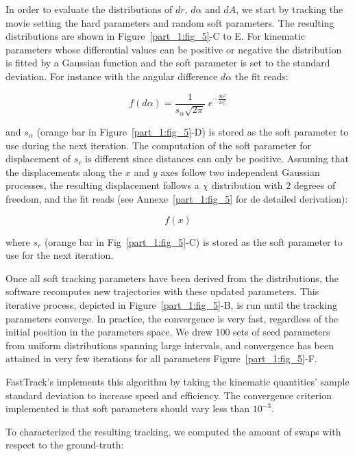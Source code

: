     In order to evaluate the distributions of $dr$, $d\alpha$ and $dA$, we start by tracking the movie setting the hard parameters and random soft parameters. The resulting distributions are shown in Figure~\ref{part_1:fig_5}-C to E. For kinematic parameters whose differential values can be positive or negative the distribution is fitted by a Gaussian function and the soft parameter is set to the standard deviation. For instance with the angular difference $d\alpha$ the fit reads:

    \begin{equation}
    f(d\alpha) = \frac{1}{s_\alpha\sqrt{2 \pi}} \; e^{-\frac{d\alpha^2}{2 s_\alpha^2}}
    \label{eq:fit_Gaussian}
    \end{equation}

    and $s_\alpha$ (orange bar in Figure~\ref{part_1:fig_5}-D) is stored as the soft parameter to use during the next iteration.
    The computation of the soft parameter for displacement of $s_r$ is different since distances can only be positive. Assuming that the displacements along the $x$ and $y$ axes follow two independent Gaussian processes, the resulting displacement follows a $\chi$ distribution with $2$ degrees of freedom, and the fit reads (see Annexe~\ref{part_1:fig_5} for de detailed derivation):

    \begin{equation}
f(x)
    \label{eq:fit_chi}
    \end{equation}

    where $s_r$ (orange bar in Fig~\ref{part_1:fig_5}-C) is stored as the soft parameter to use for the next iteration.

    Once all soft tracking parameters have been derived from the distributions, the software recomputes new trajectories with these updated parameters. This iterative process, depicted in Figure~\ref{part_1:fig_5}-B, is run until the tracking parameters converge. In practice, the convergence is very fast, regardless of the initial position in the parameters space. We drew $100$ sets of seed parameters from uniform distributions spanning large intervals, and convergence has been attained in very few iterations for all parameters Figure~\ref{part_1:fig_5}-F.

    FastTrack's implements this algorithm by taking the kinematic quantities' sample standard deviation to increase speed and efficiency. The convergence criterion implemented is that soft parameters should vary less than $10^{-3}$.

    To characterized the resulting tracking, we computed the amount of swaps with respect to the ground-truth:


